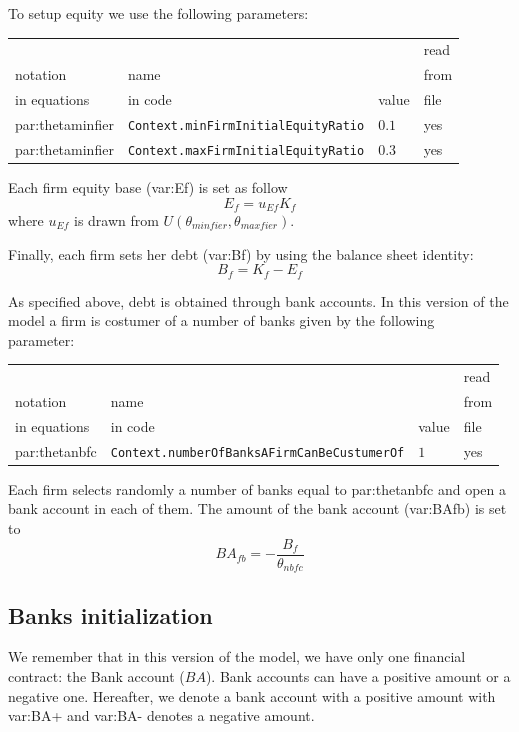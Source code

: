 \documentclass{book}
\begin{document}
To setup equity we use the following parameters:

\noindent
\begin{tabular}{l l l l}
	\hline
	& &&read\\
	notation& name &&from\\
	in equations& in code&value&file\\
	\hline
	\hline
 \gls{par:thetaminfier}&\verb+Context.minFirmInitialEquityRatio+&$0.1$&yes\\
 \gls{par:thetaminfier}&\verb+Context.maxFirmInitialEquityRatio+&$0.3$&yes\\
	\hline
\end{tabular}

\vskip5mm
Each firm equity base (\gls{var:Ef}) is set as follow
\[
	E_f=u_{Ef}K_f
\]
where $u_{Ef}$ is drawn from $U(\theta_{minfier},\theta_{maxfier})$.

Finally, each firm sets her debt (\gls{var:Bf}) by using the balance sheet identity:
\[
B_f=K_f-E_f
\]

As specified above, debt is obtained through bank accounts.
In this version of the model a firm is costumer of a number of banks given by the following\\
parameter:

\vskip2mm
\noindent
\begin{tabular}{l l l l}
	\hline
	& &&read\\
	notation& name &&from\\
	in equations& in code&value&file\\
	\hline
	\hline
 \gls{par:thetanbfc}&\verb+Context.numberOfBanksAFirmCanBeCustumerOf+&$1$&yes\\
	\hline
\end{tabular}

\vskip2mm
Each firm selects randomly a number of banks equal to \gls{par:thetanbfc} and open a bank account in each of them. The amount of the bank account (\gls{var:BAfb}) is set to
\[
	BA_{fb}=-\frac{B_f}{\theta_{nbfc}}
\]

\subsection{Banks initialization}
We remember that in this version of the model, we have only one financial contract: the Bank account ($BA$). Bank accounts can have a positive amount or a negative one. Hereafter, we denote a bank account with a positive amount with \gls{var:BA+} and \gls{var:BA-} denotes a negative amount.
\end{document}
